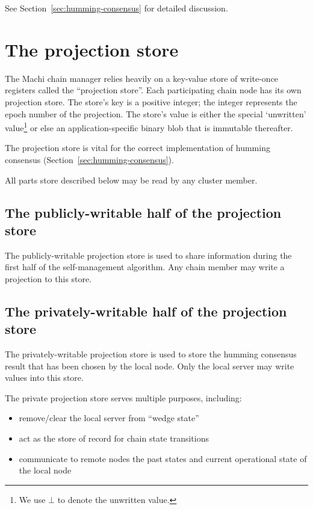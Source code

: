 \documentclass[preprint,10pt]{sigplanconf}
\begin{document}
See Section~\ref{sec:humming-consensus} for detailed discussion.

\section{The projection store}

The Machi chain manager relies heavily on a key-value store of
write-once registers called the ``projection store''.
Each participating chain node has its own projection store.
The store's key is a positive integer;
the integer represents the epoch number of the projection.  The
store's value is either the special `unwritten' value\footnote{We use
  $\bot$ to denote the unwritten value.} or else an
application-specific binary blob that is immutable thereafter.

The projection store is vital for the correct implementation of humming
consensus (Section~\ref{sec:humming-consensus}).

All parts store described below may be read by any cluster member.

\subsection{The publicly-writable half of the projection store}

The publicly-writable projection store is used to share information
during the first half of the self-management algorithm.  Any chain
member may write a projection to this store.

\subsection{The privately-writable half of the projection store}

The privately-writable projection store is used to store the humming consensus
result that has been chosen by the local node.  Only
the local server may write values into this store.

The private projection store serves multiple purposes, including:

\begin{itemize}
\item remove/clear the local server from ``wedge state''
\item act as the store of record for chain state transitions
\item communicate to remote nodes the past states and current operational
  state of the local node
\end{itemize}
\end{document}
